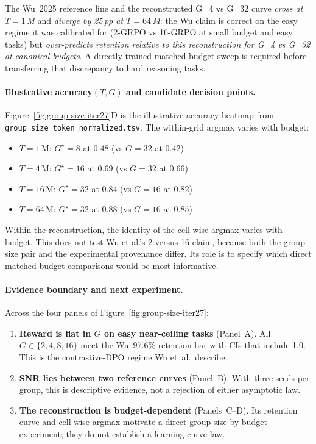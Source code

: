 \documentclass{article}
\begin{document}
The Wu~2025 reference line and the reconstructed G=4 vs G=32 curve
\emph{cross at $T{=}1\,$M} and \emph{diverge by 25\,pp at $T{=}64\,$M}:
the Wu claim is correct on the easy regime it was calibrated for
(2-GRPO vs 16-GRPO at small budget and easy tasks) but
\emph{over-predicts retention relative to this reconstruction for G=4 vs
G=32 at canonical budgets}. A directly trained matched-budget sweep is
required before transferring that discrepancy to hard reasoning tasks.

\paragraph{Illustrative accuracy$(T,G)$ and candidate decision points.}
Figure~\ref{fig:group-size-iter27}D is the illustrative accuracy
heatmap from
\texttt{group\_size\_token\_normalized.tsv}. The within-grid argmax
varies with budget:

\begin{itemize}
  \item $T{=}1\,$M: $G^\star = 8$ at $0.48$ (vs $G{=}32$ at $0.42$)
  \item $T{=}4\,$M: $G^\star = 16$ at $0.69$ (vs $G{=}32$ at $0.66$)
  \item $T{=}16\,$M: $G^\star = 32$ at $0.84$ (vs $G{=}16$ at $0.82$)
  \item $T{=}64\,$M: $G^\star = 32$ at $0.88$ (vs $G{=}16$ at $0.85$)
\end{itemize}

Within the reconstruction, the identity of the cell-wise argmax varies with
budget.  This does not test Wu et al.'s 2-versus-16 claim, because both the
group-size pair and the experimental provenance differ.  Its role is to
specify which direct matched-budget comparisons would be most informative.

\paragraph{Evidence boundary and next experiment.}
Across the four panels of Figure~\ref{fig:group-size-iter27}:

\begin{enumerate}
  \item \textbf{Reward is flat in $G$ on easy near-ceiling tasks}
        (Panel~A). All $G\in\{2,4,8,16\}$ meet the Wu~97.6\%
        retention bar with CIs that include 1.0. This is the
        contrastive-DPO regime Wu et~al.\ describe.
  \item \textbf{SNR lies between two reference curves}
        (Panel~B). With three seeds per group, this is descriptive evidence,
        not a rejection of either asymptotic law.
  \item \textbf{The reconstruction is budget-dependent}
        (Panels~C--D). Its retention curve and cell-wise argmax motivate a
        direct group-size-by-budget experiment; they do not establish a
        learning-curve law.
\end{enumerate}
\end{document}
